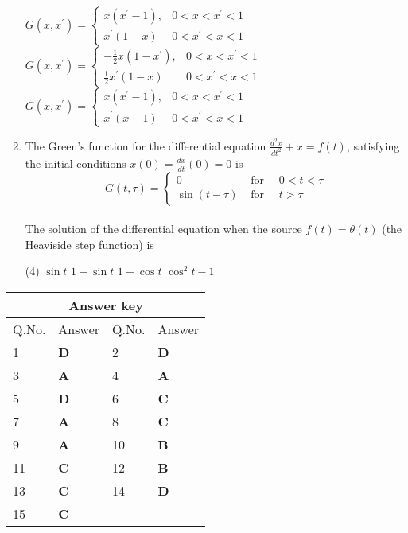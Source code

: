 \begin{enumerate}[label=\color{ocre}\textbf{\arabic*.}]
\begin{tasks}
		\task[\textbf{B.}] $G\left(x, x^{\prime}\right)=\left\{\begin{array}{ll}x\left(x^{\prime}-1\right), & 0<x<x^{\prime}<1 \\ x^{\prime}(1-x) & 0<x^{\prime}<x<1\end{array}\right.$
		\task[\textbf{C.}] $G\left(x, x^{\prime}\right)=\left\{\begin{array}{ll}-\frac{1}{2} x\left(1-x^{\prime}\right), & 0<x<x^{\prime}<1 \\ \frac{1}{2} x^{\prime}(1-x) & 0<x^{\prime}<x<1\end{array}\right.$
		\task[\textbf{D.}]  $G\left(x, x^{\prime}\right)=\left\{\begin{array}{ll}x\left(x^{\prime}-1\right), & 0<x<x^{\prime}<1 \\ x^{\prime}(x-1) & 0<x^{\prime}<x<1\end{array}\right.$
	\end{tasks}
	\item  The Green's function for the differential equation $\frac{d^{2} x}{d t^{2}}+x=f(t)$, satisfying the initial conditions $x(0)=\frac{d x}{d t}(0)=0$ is\\
	$$G(t, \tau)=\left\{\begin{array}{ll}0 & \text { for } \quad 0<t<\tau \\ \sin (t-\tau) & \text { for } \quad t>\tau\end{array}\right.$$\\
	The solution of the differential equation when the source $f(t)=\theta(t)$ (the Heaviside step function) is
	{}
	\begin{tasks}(4)
		\task[\textbf{A.}] $\sin t$
		\task[\textbf{B.}] $1-\sin t$
		\task[\textbf{C.}] $1-\cos t$
		\task[\textbf{D.}] $\cos ^{2} t-1$
	\end{tasks}
\end{enumerate}
\setlength\arrayrulewidth{1pt}
\begin{table}[H]
	\centering
	\begin{tabular}{|p{1.5cm}|p{1.5cm}||p{1.5cm}|p{1.5cm}|}
		\hline
		\multicolumn{4}{|c|}{\textbf{Answer key}}\\\hline\hline
		\rowcolor{ocrel}Q.No.&Answer&Q.No.&Answer\\\hline
		1&\textbf{D} &2&\textbf{D}\\\hline 
		3&\textbf{A} &4&\textbf{A} \\\hline
		5&\textbf{D} &6&\textbf{C} \\\hline
		7&\textbf{A}&8&\textbf{C}\\\hline
		9&\textbf{A}&10&\textbf{B}\\\hline
		11&\textbf{C} &12&\textbf{B}\\\hline
		13&\textbf{C}&14&\textbf{D}\\\hline
		15&\textbf{C}& &\\\hline
		
	\end{tabular}
\end{table}
